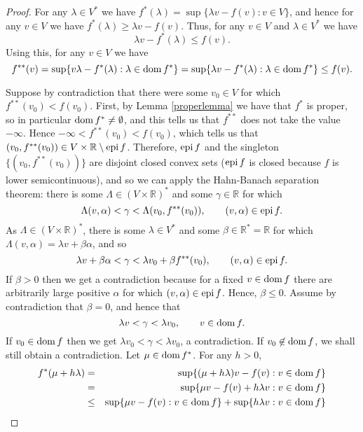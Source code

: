 \documentclass{article}
\newcommand{\epi}{\ensuremath\mathrm{epi}\,}
\newcommand{\dom}{\ensuremath\mathrm{dom}\,}
\theoremstyle{definition}
\begin{document}
\begin{proof}
For any $\lambda \in V^*$ we have $f^*(\lambda)=\sup\{\lambda v  - f(v): v\in V\}$, and hence
for any $v \in V$ we have
$f^*(\lambda) \geq \lambda v - f(v)$.
Thus, for any $v \in V$ and $\lambda \in V^*$ we have
\[
\lambda v -f^*(\lambda) \leq f(v).
\]
Using this, for any $v \in V$ we have
\[
f^{**}(v)=\sup\{v\lambda - f^*(\lambda): \lambda \in \dom f^*\}
=\sup\{\lambda v-f^*(\lambda):\lambda \in \dom f^*\}
 \leq f(v).
\]

Suppose by contradiction that there were some $v_0 \in V$ for which $f^{**}(v_0)<f(v_0)$. First,  
by Lemma \ref{properlemma} we have that $f^*$ is proper, so in particular $\dom f^* \neq \emptyset$,
and this tells us that $f^{**}$ does not take the value $-\infty$. Hence $-\infty<f^{**}(v_0)<f(v_0)$, which tells us that $(v_0,f^{**}(v_0)) \in V \times \mathbb{R} \setminus  \epi f$.
Therefore, $\epi f$ and the singleton $\{(v_0,f^{**}(v_0))\}$ are disjoint closed convex sets ($\epi f$ is closed because
$f$ is lower semicontinuous), and so we can apply the Hahn-Banach separation
theorem: there is some $\Lambda \in (V \times \mathbb{R})^*$ and some $\gamma \in \mathbb{R}$ for which
\[
\Lambda (v,\alpha) < \gamma < \Lambda (v_0,f^{**}(v_0)), \qquad (v,\alpha) \in \epi f.
\]
As $\Lambda \in (V \times \mathbb{R})^*$, there is some $\lambda \in V^*$ and some $\beta \in \mathbb{R}^*=\mathbb{R}$ for which
$\Lambda (v,\alpha) = \lambda v + \beta \alpha$, and so 
\begin{equation}
\lambda v + \beta \alpha < \gamma < \lambda v_0 + \beta f^{**}(v_0), \qquad (v,\alpha) \in \epi f.
\label{beta}
\end{equation}
If $\beta>0$ then we get a contradiction because for a fixed $v \in \dom f$ there are arbitrarily large positive $\alpha$ for which
$(v,\alpha) \in \epi f$. Hence, $\beta \leq 0$. Assume by contradiction that $\beta=0$, and hence that
\begin{equation}
\lambda v < \gamma <\lambda v_0, \qquad v \in \dom f.
\label{beta0}
\end{equation}
 If $v_0 \in \dom f$ then we get
$\lambda v_0 < \gamma<\lambda v_0$, a contradiction. If $v_0 \not \in \dom f$, we shall still obtain a contradiction.
Let $\mu \in \dom f^*$. For any $h>0$,
\begin{eqnarray*}
f^*(\mu+h\lambda)&=&\sup\{(\mu+h\lambda)v-f(v):v \in \dom f\}\\
&=&\sup\{\mu v -f(v) + h\lambda v:v \in \dom f\}\\
&\leq&\sup\{\mu v-f(v): v\in \dom f\} + \sup\{h\lambda v: v \in \dom f\}\\

\end{eqnarray*}
\end{proof}
\end{document}
